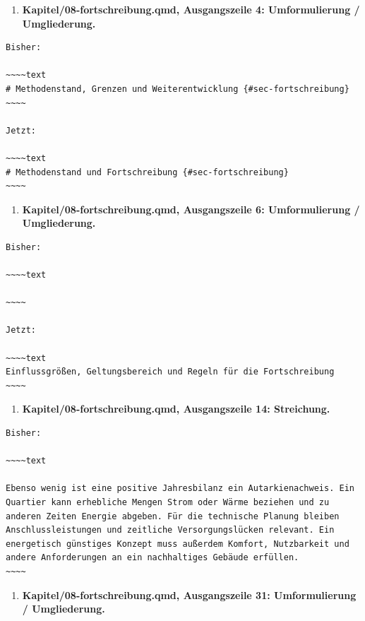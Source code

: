 \documentclass[
  ngerman,
  a4paper,
  DIV=11]{scrreprt}
\providecommand{\tightlist}{%
  \setlength{\itemsep}{0pt}\setlength{\parskip}{0pt}}
\begin{document}
\begin{enumerate}
\def\labelenumi{\arabic{enumi}.}
\setcounter{enumi}{117}
\tightlist
\item
  \textbf{Kapitel/08-fortschreibung.qmd, Ausgangszeile 4: Umformulierung
  / Umgliederung.}
\end{enumerate}

\begin{verbatim}
Bisher:

~~~~text
# Methodenstand, Grenzen und Weiterentwicklung {#sec-fortschreibung}
~~~~

Jetzt:

~~~~text
# Methodenstand und Fortschreibung {#sec-fortschreibung}
~~~~
\end{verbatim}

\begin{enumerate}
\def\labelenumi{\arabic{enumi}.}
\setcounter{enumi}{118}
\tightlist
\item
  \textbf{Kapitel/08-fortschreibung.qmd, Ausgangszeile 6: Umformulierung
  / Umgliederung.}
\end{enumerate}

\begin{verbatim}
Bisher:

~~~~text

~~~~

Jetzt:

~~~~text
Einflussgrößen, Geltungsbereich und Regeln für die Fortschreibung
~~~~
\end{verbatim}

\begin{enumerate}
\def\labelenumi{\arabic{enumi}.}
\setcounter{enumi}{119}
\tightlist
\item
  \textbf{Kapitel/08-fortschreibung.qmd, Ausgangszeile 14: Streichung.}
\end{enumerate}

\begin{verbatim}
Bisher:

~~~~text

Ebenso wenig ist eine positive Jahresbilanz ein Autarkienachweis. Ein Quartier kann erhebliche Mengen Strom oder Wärme beziehen und zu anderen Zeiten Energie abgeben. Für die technische Planung bleiben Anschlussleistungen und zeitliche Versorgungslücken relevant. Ein energetisch günstiges Konzept muss außerdem Komfort, Nutzbarkeit und andere Anforderungen an ein nachhaltiges Gebäude erfüllen.
~~~~
\end{verbatim}

\begin{enumerate}
\def\labelenumi{\arabic{enumi}.}
\setcounter{enumi}{120}
\tightlist
\item
  \textbf{Kapitel/08-fortschreibung.qmd, Ausgangszeile 31:
  Umformulierung / Umgliederung.}
\end{enumerate}
\end{document}
